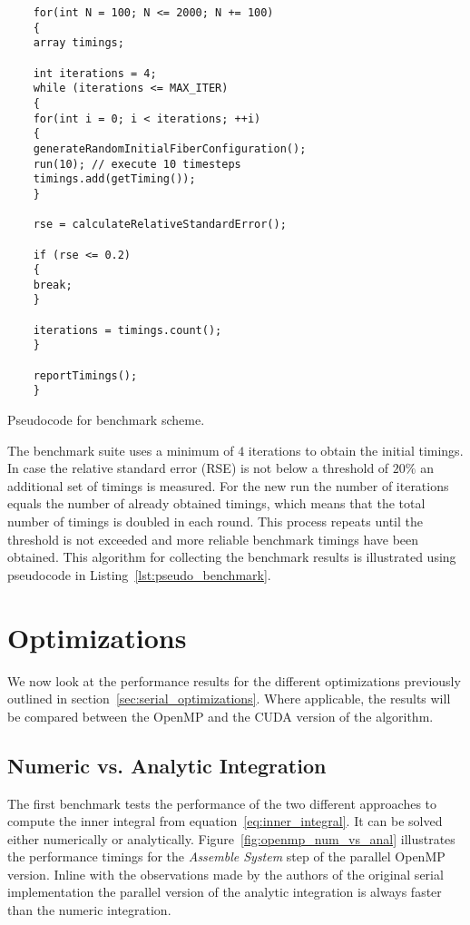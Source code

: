 \begin{listing}[!htbp]
  \centering
  \begin{verbatim}
    for(int N = 100; N <= 2000; N += 100)
    {
    array timings;

    int iterations = 4;
    while (iterations <= MAX_ITER)
    {
    for(int i = 0; i < iterations; ++i)
    {
    generateRandomInitialFiberConfiguration();
    run(10); // execute 10 timesteps
    timings.add(getTiming());
    }

    rse = calculateRelativeStandardError();

    if (rse <= 0.2)
    {
    break;
    }

    iterations = timings.count();
    }

    reportTimings();
    }
  \end{verbatim}
  \caption{Pseudocode for benchmark scheme.}
  \label{lst:pseudo_benchmark}
\end{listing}

The benchmark suite uses a minimum of $4$ iterations to obtain the initial timings. In case the relative standard error (RSE) is not below a threshold of $20\%$ an additional set of timings is measured. For the new run the number of iterations equals the number of already obtained timings, which means that the total number of timings is doubled in each round. This process repeats until the threshold is not exceeded and more reliable benchmark timings have been obtained. This algorithm for collecting the benchmark results is illustrated using pseudocode in Listing~\ref{lst:pseudo_benchmark}.

\section{Optimizations}

We now look at the performance results for the different optimizations previously outlined in section~\ref{sec:serial_optimizations}. Where applicable, the results will be compared between the OpenMP and the CUDA version of the algorithm.

\subsection{Numeric vs. Analytic Integration}
\label{subsec:bench_numeric_vs_analytic}

The first benchmark tests the performance of the two different approaches to compute the inner integral from equation~\eqref{eq:inner_integral}. It can be solved either numerically or analytically. Figure~\ref{fig:openmp_num_vs_anal} illustrates the performance timings for the \emph{Assemble System} step of the parallel OpenMP version. Inline with the observations made by the authors of the original serial implementation \cite{Tornberg2006} the parallel version of the analytic integration is always faster than the numeric integration.

